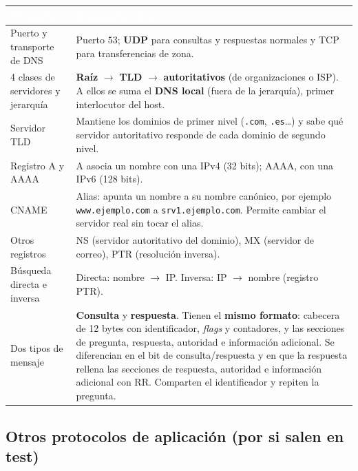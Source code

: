 \documentclass[11pt,a4paper]{article}
\newcommand{\hd}[1]{\cellcolor{uahblue}\textcolor{white}{\textbf{#1}}}
\begin{document}
\begin{tabularx}{\textwidth}{@{}L{4.2cm}X@{}}
\toprule
\hd{Pregunta} & \hd{Respuesta corta} \\
\midrule
Puerto y transporte de DNS & Puerto $53$; \textbf{UDP} para consultas y respuestas normales y TCP para transferencias de zona. \\
4 clases de servidores y jerarquía & \textbf{Raíz} $\to$ \textbf{TLD} $\to$ \textbf{autoritativos} (de organizaciones o ISP). A ellos se suma el \textbf{DNS local} (fuera de la jerarquía), primer interlocutor del host. \\
Servidor TLD & Mantiene los dominios de primer nivel (\texttt{.com}, \texttt{.es}\dots) y sabe qué servidor autoritativo responde de cada dominio de segundo nivel. \\
Registro A y AAAA & A asocia un nombre con una IPv4 (32 bits); AAAA, con una IPv6 (128 bits). \\
CNAME & Alias: apunta un nombre a su nombre canónico, por ejemplo \texttt{www.ejemplo.com} a \texttt{srv1.ejemplo.com}. Permite cambiar el servidor real sin tocar el alias. \\
Otros registros & NS (servidor autoritativo del dominio), MX (servidor de correo), PTR (resolución inversa). \\
Búsqueda directa e inversa & Directa: nombre $\to$ IP. Inversa: IP $\to$ nombre (registro PTR). \\
Dos tipos de mensaje & \textbf{Consulta} y \textbf{respuesta}. Tienen el \textbf{mismo formato}: cabecera de 12 bytes con identificador, \emph{flags} y contadores, y las secciones de pregunta, respuesta, autoridad e información adicional. Se diferencian en el bit de consulta/respuesta y en que la respuesta rellena las secciones de respuesta, autoridad e información adicional con RR. Comparten el identificador y repiten la pregunta. \\
\bottomrule
\end{tabularx}

\subsection{Otros protocolos de aplicación (por si salen en test)}
\end{document}
